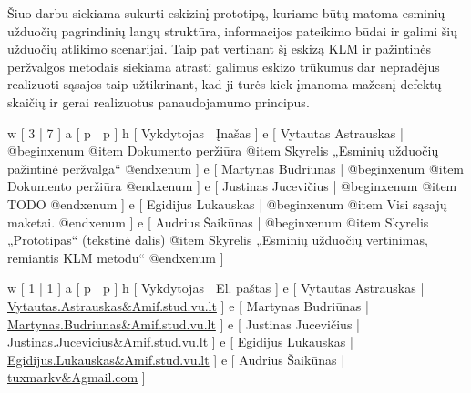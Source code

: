 
Šiuo darbu siekiama sukurti eskizinį prototipą, kuriame būtų matoma
esminių užduočių pagrindinių langų struktūra, informacijos
pateikimo būdai ir galimi šių užduočių atlikimo scenarijai. Taip
pat vertinant šį eskizą KLM ir pažintinės peržvalgos metodais
siekiama atrasti galimus eskizo trūkumus dar nepradėjus realizuoti
sąsajos taip užtikrinant, kad ji turės kiek įmanoma mažesnį
defektų skaičių ir gerai realizuotus panaudojamumo principus.

\xtable
{
  w [ 3  | 7 ]
  a [ p  | p ]
  h [ Vykdytojas | Įnašas ]
  e [ Vytautas Astrauskas
  | @begin{xenum} 
      @item Dokumento peržiūra
      @item Skyrelis „Esminių užduočių pažintinė peržvalga“
    @end{xenum}
  ]
  e [ Martynas Budriūnas
  | @begin{xenum} 
      @item Dokumento peržiūra
    @end{xenum}
  ]
  e [ Justinas Jucevičius 
  | @begin{xenum} 
      @item TODO
    @end{xenum}
  ]
  e [ Egidijus Lukauskas 
  | @begin{xenum} 
      @item Visi sąsajų maketai.
    @end{xenum}
  ]
  e [ Audrius Šaikūnas 
  | @begin{xenum} 
      @item Skyrelis „Prototipas“ (tekstinė dalis)
      @item Skyrelis „Esminių užduočių vertinimas, remiantis KLM metodu“
    @end{xenum}
  ]
}

\xtableu
{
  w [ 1 | 1 ]
  a [ p | p ]
  h [ Vykdytojas | El. paštas ]
  e [ Vytautas Astrauskas | \url{Vytautas.Astrauskas&Amif.stud.vu.lt} ]
  e [ Martynas Budriūnas  | \url{Martynas.Budriunas&Amif.stud.vu.lt} ]
  e [ Justinas Jucevičius | \url{Justinas.Jucevicius&Amif.stud.vu.lt} ]
  e [ Egidijus Lukauskas  | \url{Egidijus.Lukauskas&Amif.stud.vu.lt} ]
  e [ Audrius Šaikūnas    | \url{tuxmarkv&Agmail.com} ]
}
